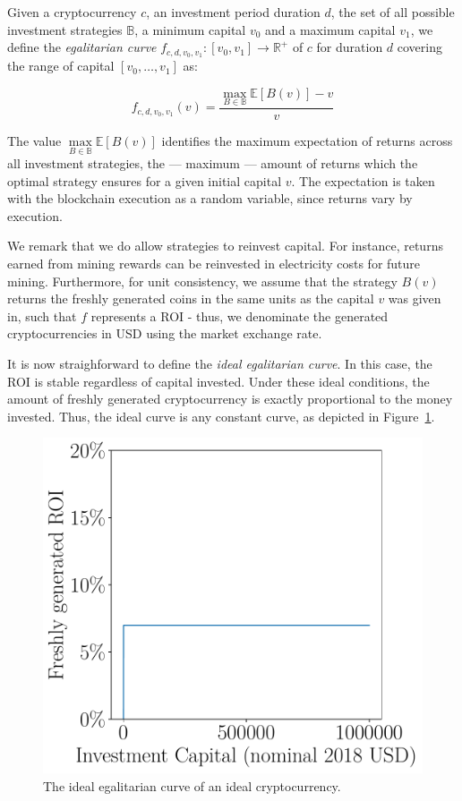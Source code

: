 \begin{definition}
    Given a cryptocurrency $c$, an investment period duration $d$, the set of
    all possible investment strategies $\mathbb{B}$, a minimum capital $v_0$
    and a maximum capital $v_1$, we define the \emph{egalitarian curve}
    $f_{c,d,v_0,v_1}: [v_0, v_1] \longrightarrow \mathbb{R}^+$ of $c$ for
    duration $d$ covering the range of capital $[v_0, \dots, v_1]$ as:

    \[
        f_{c,d,v_0,v_1}(v) = \frac{\underset{B \in \mathbb{B}}{\max}{\mathbb{E}[B(v)]} - v}{v}
    \]
\end{definition}

The value $\underset{B \in \mathbb{B}}{\max}{\mathbb{E}[B(v)]}$ identifies the maximum expectation of
returns across all investment strategies, \ie the --- maximum --- amount of
returns which the optimal strategy ensures for a given initial capital $v$.
The expectation is taken with the blockchain execution as a random variable,
since returns vary by execution.

We remark that we do allow strategies to reinvest capital. For instance,
returns earned from mining rewards can be reinvested in electricity costs for
future mining. Furthermore, for unit consistency, we assume that the strategy
$B(v)$ returns the freshly generated coins in the same units as the capital $v$
was given in, such that $f$ represents a ROI - thus, we denominate the
generated cryptocurrencies in USD using the market exchange rate.

It is now straighforward to define the \emph{ideal egalitarian curve}. In this
case, the ROI is stable regardless of capital invested. Under these ideal
conditions, the amount of freshly generated cryptocurrency is exactly
proportional to the money invested. Thus, the ideal curve is any constant
curve, as depicted in Figure~\ref{fig:ideal}.

\begin{figure}
    \centering
    \includegraphics[width=0.5 \columnwidth,keepaspectratio]{figures/ideal.pdf}
    \caption{The ideal egalitarian curve of an ideal cryptocurrency.}
    \label{fig:ideal}
\end{figure}

